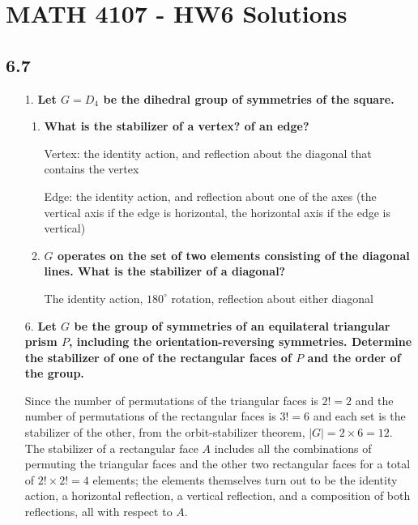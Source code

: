 \documentclass[a4paper,12pt]{article}
\begin{document}
\section*{MATH 4107 - HW6 Solutions}

\subsection*{6.7}
\begin{enumerate}
    \item[1.]
        \boldmath
        \textbf{Let $G = D_4$ be the dihedral group of symmetries of the square.} \par
        \begin{enumerate}
            \item
                \boldmath
                \textbf{What is the stabilizer of a vertex? of an edge?} \par
                \unboldmath
                Vertex: the identity action, and reflection about the diagonal that contains the vertex \par
                Edge: the identity action, and reflection about one of the axes (the vertical axis if the edge is horizontal, the horizontal axis if the edge is vertical)

            \item
                \boldmath
                \textbf{$G$ operates on the set of two elements consisting of the diagonal lines. What is the stabilizer of a diagonal?} \par
                \unboldmath
                The identity action, $180^\circ$ rotation, reflection about either diagonal
        \end{enumerate}
        \unboldmath

    \item[6.]
        \boldmath
        \textbf{Let $G$ be the group of symmetries of an equilateral triangular prism $P$, including the orientation-reversing symmetries. Determine the stabilizer of one of the rectangular faces of $P$ and the order of the group.} \par
        \unboldmath
        Since the number of permutations of the triangular faces is $2! = 2$ and the number of permutations of the rectangular faces is $3! = 6$ and each set is the stabilizer of the other, from the orbit-stabilizer theorem, $|G| = 2 \times 6 = 12$. The stabilizer of a rectangular face $A$ includes all the combinations of permuting the triangular faces and the other two rectangular faces for a total of $2! \times 2! = 4$ elements; the elements themselves turn out to be the identity action, a horizontal reflection, a vertical reflection, and a composition of both reflections, all with respect to $A$.


\end{enumerate}
\end{document}
